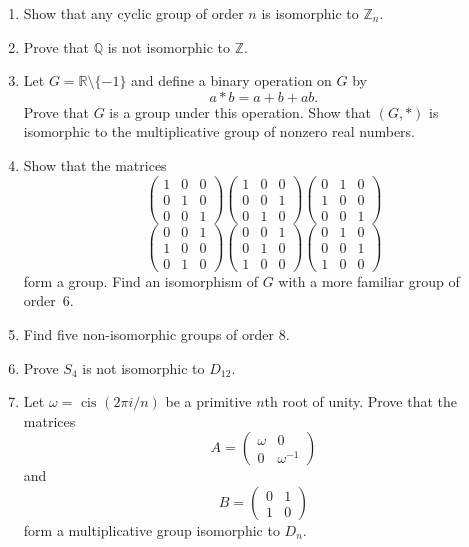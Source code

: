 {\begin{enumerate}
\item 
Show that any cyclic group of order $n$ is isomorphic to ${\mathbb Z}_n$. 
 

\item
Prove that ${\mathbb Q}$ is not isomorphic to ${\mathbb Z}$.
 

\item
Let $G = {\mathbb R} \setminus \{ -1 \}$ and define a binary operation on
$G$ by 
$$
a \ast b = a + b + ab.
$$
Prove that $G$ is a group under this operation. Show that $(G, *)$ is
isomorphic to the multiplicative group of nonzero real numbers.
 

\item
Show that the matrices
$$
\left(
\begin{array}{ccc}
1 & 0 & 0 \\
0 & 1 & 0 \\
0 & 0 & 1
\end{array}
\right)
\left(
\begin{array}{ccc}
1 & 0 & 0 \\
0 & 0 & 1 \\
0 & 1 & 0
\end{array}
\right)
\left(
\begin{array}{ccc}
0 & 1 & 0 \\
1 & 0 & 0 \\
0 & 0 & 1
\end{array}
\right)
$$
$$
\left(
\begin{array}{ccc}
0 & 0 & 1 \\
1 & 0 & 0 \\
0 & 1 & 0
\end{array}
\right)
\left(
\begin{array}{ccc}
0 & 0 & 1 \\
0 & 1 & 0 \\
1 & 0 & 0
\end{array}
\right)
\left(
\begin{array}{ccc}
0 & 1 & 0 \\
0 & 0 & 1 \\
1 & 0 & 0
\end{array}
\right)
$$
form a group. Find an isomorphism of $G$ with a more familiar group of
order~6. 

 
\item
Find five non-isomorphic groups of order 8.
 

\item
Prove $S_4$ is not isomorphic to $D_{12}$.
 

\item
Let $\omega = \mbox{ cis } (2 \pi i/n)$ be a primitive $n$th root of
unity.  Prove that the matrices 
$$
A=
\left(
\begin{array}{ccc}
\omega & 0 \\
0 & \omega^{-1}
\end{array}
\right)
$$
and
$$
B =
\left(
\begin{array}{ccc}
0 & 1 \\
1 & 0
\end{array}
\right)
$$
form a multiplicative group isomorphic to $D_n$.
 


\end{enumerate}}
